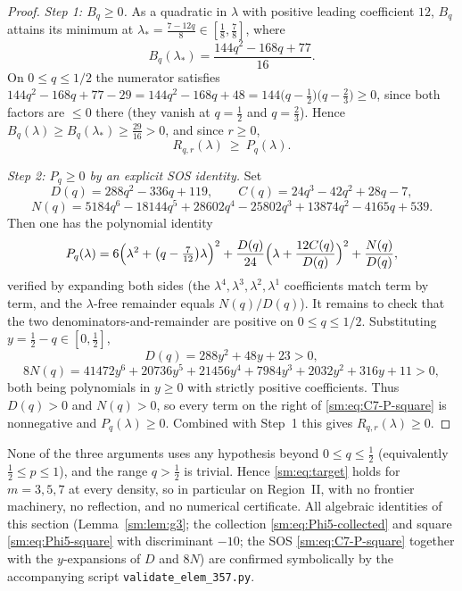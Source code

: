 \begin{proof}
\emph{Step 1: $B_q\ge0$.}  As a quadratic in $\lambda$ with positive leading
coefficient $12$, $B_q$ attains its minimum at
$\lambda_*=\tfrac{7-12q}{8}\in[\tfrac18,\tfrac78]$, where
\[
   B_q(\lambda_*)=\frac{144q^{2}-168q+77}{16}.
\]
On $0\le q\le1/2$ the numerator satisfies
$144q^{2}-168q+77-29=144q^{2}-168q+48=144\bigl(q-\tfrac12\bigr)\bigl(q-\tfrac23\bigr)\ge0$,
since both factors are $\le0$ there (they vanish at $q=\tfrac12$ and
$q=\tfrac23$).  Hence $B_q(\lambda)\ge B_q(\lambda_*)\ge\tfrac{29}{16}>0$, and
since $r\ge0$,
\[
   R_{q,r}(\lambda)\ \ge\ P_q(\lambda).
\]

\emph{Step 2: $P_q\ge0$ by an explicit SOS identity.}  Set
\[
   D(q)=288q^{2}-336q+119,\qquad
   C(q)=24q^{3}-42q^{2}+28q-7,
\]
\[
   N(q)=5184q^{6}-18144q^{5}+28602q^{4}-25802q^{3}+13874q^{2}-4165q+539 .
\]
Then one has the polynomial identity
\begin{equation}\label{sm:eq:C7-P-square}
   P_q(\lambda)=6\Bigl(\lambda^{2}+\bigl(q-\tfrac{7}{12}\bigr)\lambda\Bigr)^{2}
   +\frac{D(q)}{24}\Bigl(\lambda+\frac{12C(q)}{D(q)}\Bigr)^{2}
   +\frac{N(q)}{D(q)},
\end{equation}
verified by expanding both sides (the $\lambda^4,\lambda^3,\lambda^2,\lambda^1$
coefficients match term by term, and the $\lambda$-free remainder equals
$N(q)/D(q)$).  It remains to check that the two denominators-and-remainder are
positive on $0\le q\le1/2$.  Substituting $y=\tfrac12-q\in[0,\tfrac12]$,
\[
   D(q)=288y^{2}+48y+23>0,
\]
\[
   8N(q)=41472y^{6}+20736y^{5}+21456y^{4}+7984y^{3}+2032y^{2}+316y+11>0,
\]
both being polynomials in $y\ge0$ with strictly positive coefficients.  Thus
$D(q)>0$ and $N(q)>0$, so every term on the right of
\eqref{sm:eq:C7-P-square} is nonnegative and $P_q(\lambda)\ge0$.  Combined with
Step~1 this gives $R_{q,r}(\lambda)\ge0$.
\end{proof}

\begin{remark}\label{sm:rmk:allp}
None of the three arguments uses any hypothesis beyond $0\le q\le\tfrac12$
(equivalently $\tfrac12\le p\le1$), and the range $q>\tfrac12$ is trivial.
Hence \eqref{sm:eq:target} holds for $m=3,5,7$ at every density, so in
particular on Region~II, with no frontier machinery, no reflection, and no
numerical certificate.  All algebraic identities of this section
(Lemma~\ref{sm:lem:g3}; the collection \eqref{sm:eq:Phi5-collected} and square
\eqref{sm:eq:Phi5-square} with discriminant $-10$; the SOS
\eqref{sm:eq:C7-P-square} together with the $y$-expansions of $D$ and $8N$) are
confirmed symbolically by the accompanying script
\texttt{validate\_elem\_357.py}.
\end{remark}
